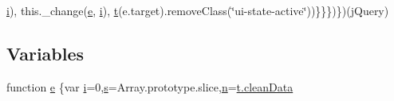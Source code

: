 \begin{DoxyCompactItemize}
\hyperlink{static_2root_2js_2jquery-ui_8custom_8min_8js_aba29173262d28394924f99eb2ed5b31b}{i}), this.\-\_\-change(\hyperlink{static_2root_2js_2jquery-ui_8custom_8min_8js_abea95a4e94bc6f4151d5683d4c12c3f4}{e}, \hyperlink{static_2root_2js_2jquery-ui_8custom_8min_8js_aba29173262d28394924f99eb2ed5b31b}{i}), \hyperlink{static_2root_2js_2bootstrap_2jquery-ui-1_810_84_8custom_8min_8js_acf335ef347969ef6dc8387e680fb289e}{t}(e.\-target).remove\-Class(\char`\"{}ui-\/state-\/active\char`\"{}))\}\}\})\})(j\-Query)
\end{DoxyCompactItemize}
\subsection*{Variables}
\begin{DoxyCompactItemize}
\item 
function \hyperlink{static_2root_2js_2bootstrap_2jquery-ui-1_810_84_8custom_8min_8js_a2c038346d47955cbe2cb91e338edd7e1}{e} \{var \hyperlink{static_2root_2js_2jquery-ui_8custom_8min_8js_aba29173262d28394924f99eb2ed5b31b}{i}=0,\hyperlink{static_2root_2js_2jquery-ui_8custom_8min_8js_a387623556fbc0ba947c5babd49e10aaa}{s}=Array.\-prototype.\-slice,\hyperlink{static_2root_2js_2intro_8min_8js_afc984c4f6c68ce30a0af99006f5f8d27}{n}=\hyperlink{static_2root_2js_2jquery-ui_8custom_8min_8js_a69cf3a5538f71f728a82d0faf3b132c7}{t.\-clean\-Data}
\item 

\end{DoxyCompactItemize}
